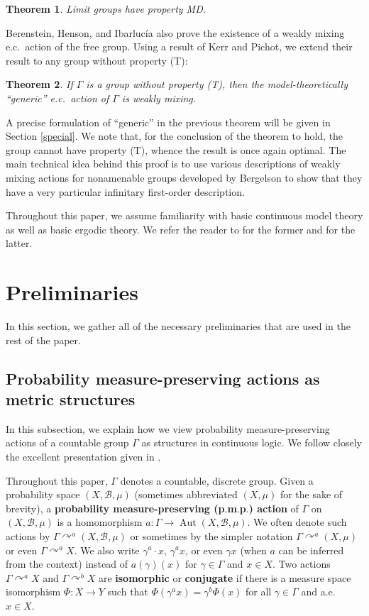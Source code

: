 \documentclass[12pt]{amsart}
\newtheorem*{thm*}{Theorem}
\theoremstyle{definition}
\newcommand{\pmp}{p{$.$}m{$.$}p{$.$}}
\newcommand{\acts}{\curvearrowright}
\begin{document}
\begin{thm*}
Limit groups have property MD.
\end{thm*}

Berenstein, Henson, and Ibarluc\'ia also prove the existence of a weakly mixing e.c.\ action of the free group.  Using a result of Kerr and Pichot, we extend their result to any group without property (T):

\begin{thm*}
If $\Gamma$ is a group without property (T), then the model-theoretically ``generic'' e.c.\ action of $\Gamma$ is weakly mixing.
\end{thm*}

A precise formulation of ``generic'' in the previous theorem will be given in Section \ref{special}.  We note that, for the conclusion of the theorem to hold, the group cannot have property (T), whence the result is once again optimal.  The main technical idea behind this proof is to use various descriptions of weakly mixing actions for nonamenable groups developed by Bergelson to show that they have a very particular infinitary first-order description.

Throughout this paper, we assume familiarity with basic continuous model theory as well as basic ergodic theory.  We refer the reader to \cite{bbhu} for the former and \cite{Walters} for the latter.

\section{Preliminaries}

In this section, we gather all of the necessary preliminaries that are used in the rest of the paper.

\subsection{Probability measure-preserving actions as metric structures}\label{pmpstructures}

In this subsection, we explain how we view probability measure-preserving actions of a countable group $\Gamma$ as structures in continuous logic.  We follow closely the excellent presentation given in \cite{IT}.

Throughout this paper, $\Gamma$ denotes a countable, discrete group.  Given a probability space $(X,\mathcal{B},\mu)$ (sometimes abbreviated $(X,\mu)$ for the sake of brevity), a \textbf{probability measure-preserving (\pmp) action} of $\Gamma$ on $(X,\mathcal{B},\mu)$ is a homomorphism $a:\Gamma\to \operatorname{Aut}(X,\mathcal{B},\mu)$.  We often denote such actions by $\Gamma\acts^a (X,\mathcal{B},\mu)$ or sometimes by the simpler notation $\Gamma\acts^a (X,\mu)$ or even $\Gamma\acts^a X$.  We also write $\gamma^a \cdot x$, $\gamma^a x$, or even $\gamma x$ (when $a$ can be inferred from the context) instead of $a(\gamma)(x)$ for $\gamma\in \Gamma$ and $x\in X$.  Two actions $\Gamma\acts^a X$ and $\Gamma \acts^b X$ are \textbf{isomorphic} or \textbf{conjugate} if there is a measure space isomorphism $\Phi:X\to Y$ such that $\Phi(\gamma^a x)=\gamma^b \Phi(x)$ for all $\gamma\in \Gamma$ and a.e. $x\in X$.  
\end{document}

